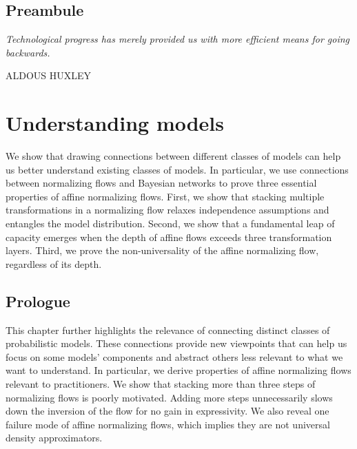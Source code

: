 \thispagestyle{empty}
\section*{Preambule}

\vfill

{
\textit{\justify
   Technological progress has merely provided us with more efficient means for going backwards.}

  \par\bigskip
  \raggedleft\MakeUppercase{Aldous Huxley}
  \par%
}


\chapter{Understanding models}\label{ch:04}

\begin{chapter_outline}

  We show that drawing connections between different classes of models can help us better understand existing classes of models.
  In particular, we use connections between normalizing flows and Bayesian networks to prove three essential properties of affine normalizing flows.
  First, we show that stacking multiple transformations in a normalizing flow relaxes independence assumptions and entangles the model distribution.
  Second, we show that a fundamental leap of capacity emerges when the depth of affine flows exceeds three transformation layers.
  Third, we prove the non-universality of the affine normalizing flow, regardless of its depth.
\end{chapter_outline}

\section{Prologue}
This chapter further highlights the relevance of connecting distinct classes of probabilistic models. These connections provide new viewpoints that can help us focus on some models' components and abstract others less relevant to what we want to understand. In particular, we derive properties of affine normalizing flows relevant to practitioners. We show that stacking more than three steps of normalizing flows is poorly motivated. Adding more steps unnecessarily slows down the inversion of the flow for no gain in expressivity. We also reveal one failure mode of affine normalizing flows, which implies they are not universal density approximators.

